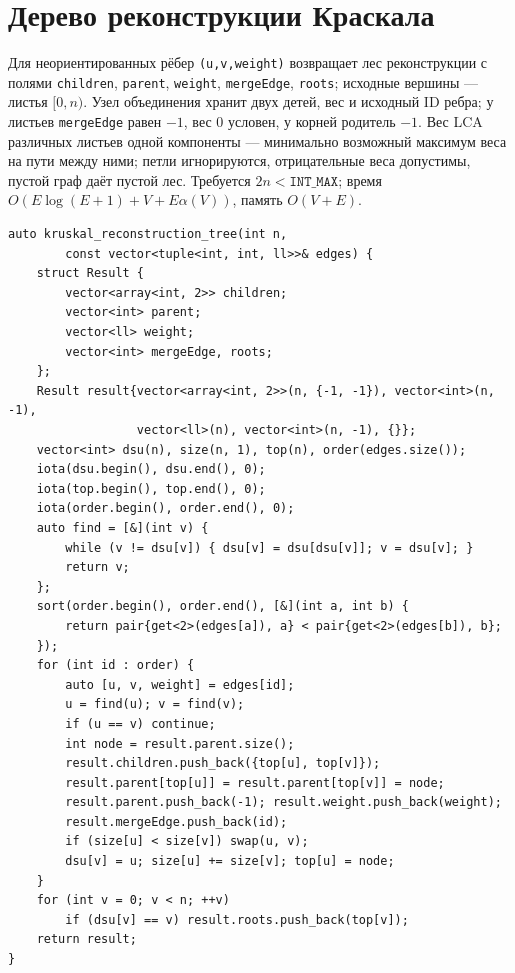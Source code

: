 \section{Дерево реконструкции Краскала}
Для неориентированных рёбер \texttt{(u,v,weight)} возвращает лес реконструкции с полями \texttt{children}, \texttt{parent}, \texttt{weight}, \texttt{mergeEdge}, \texttt{roots}; исходные вершины --- листья $[0,n)$.
Узел объединения хранит двух детей, вес и исходный ID ребра; у листьев \texttt{mergeEdge} равен $-1$, вес 0 условен, у корней родитель $-1$.
Вес LCA различных листьев одной компоненты --- минимально возможный максимум веса на пути между ними; петли игнорируются, отрицательные веса допустимы, пустой граф даёт пустой лес.
Требуется $2n<\texttt{INT\_MAX}$; время $O(E\log(E+1)+V+E\alpha(V))$, память $O(V+E)$.
\begin{lstlisting}[name=advanced_graph_kruskal_tree]
auto kruskal_reconstruction_tree(int n,
        const vector<tuple<int, int, ll>>& edges) {
    struct Result {
        vector<array<int, 2>> children;
        vector<int> parent;
        vector<ll> weight;
        vector<int> mergeEdge, roots;
    };
    Result result{vector<array<int, 2>>(n, {-1, -1}), vector<int>(n, -1),
                  vector<ll>(n), vector<int>(n, -1), {}};
    vector<int> dsu(n), size(n, 1), top(n), order(edges.size());
    iota(dsu.begin(), dsu.end(), 0);
    iota(top.begin(), top.end(), 0);
    iota(order.begin(), order.end(), 0);
    auto find = [&](int v) {
        while (v != dsu[v]) { dsu[v] = dsu[dsu[v]]; v = dsu[v]; }
        return v;
    };
    sort(order.begin(), order.end(), [&](int a, int b) {
        return pair{get<2>(edges[a]), a} < pair{get<2>(edges[b]), b};
    });
    for (int id : order) {
        auto [u, v, weight] = edges[id];
        u = find(u); v = find(v);
        if (u == v) continue;
        int node = result.parent.size();
        result.children.push_back({top[u], top[v]});
        result.parent[top[u]] = result.parent[top[v]] = node;
        result.parent.push_back(-1); result.weight.push_back(weight);
        result.mergeEdge.push_back(id);
        if (size[u] < size[v]) swap(u, v);
        dsu[v] = u; size[u] += size[v]; top[u] = node;
    }
    for (int v = 0; v < n; ++v)
        if (dsu[v] == v) result.roots.push_back(top[v]);
    return result;
}
\end{lstlisting}
